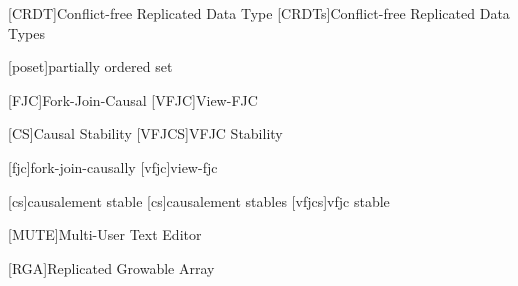 \usepackage[printonlyused,withpage]{acronym}

[CRDT]{Conflict-free Replicated Data Type}
[CRDTs]{Conflict-free Replicated Data Types}

[poset]{partially ordered set}

[FJC]{Fork-Join-Causal}
[VFJC]{View-\acl{FJC}}

[CS]{Causal Stability}
[VFJCS]{\acl{VFJC} Stability}

[fjc]{fork-join-causally}
[vfjc]{view-\acl{fjc}}

[cs]{causalement stable}
[cs]{causalement stables}
[vfjcs]{\acl{vfjc} stable}

[MUTE]{Multi-User Text Editor}

[RGA]{Replicated Growable Array}